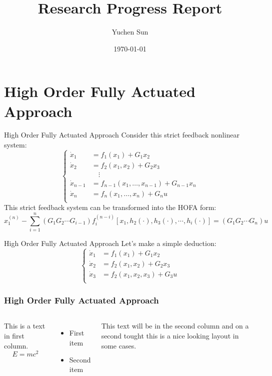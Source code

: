 \documentclass{beamer}
\title{Research Progress Report}
\author{Yuchen Sun}
\institute{Ocean University of China}
\date{\today}
\begin{document}
\maketitle
\footnotesize
\begin{frame}
    \tableofcontents
\end{frame}
\section{High Order Fully Actuated Approach}

\begin{frame}{High Order Fully Actuated Approach}
Consider this strict feedback nonlinear system:
$$
\left\{
\begin{aligned}
\dot{x}_1&=f_1(x_1)+G_1x_2\\
\dot{x}_2&=f_2(x_1,x_2)+G_2x_3\\
&\quad\vdots\\
\dot{x}_{n-1}&=f_{n-1}(x_1,\ldots,x_{n-1})+G_{n-1}x_n\\
\dot{x}_n&=f_n(x_1,\ldots,x_n)+G_nu\\
\end{aligned}
\right.
$$
This strict feedback system can be transformed into the HOFA form:
$$
x_1^{(n)}-\sum_{i=1}^{n}(G_1G_2{\cdots}G_{i-1})f_{i}^{(n-i)}[x_1,h_2(\cdot),h_3(\cdot),\cdots,h_i(\cdot)]=(G_1G_2{\cdots}G_{n})u
$$
\end{frame}

\begin{frame}{High Order Fully Actuated Approach}
Let's make a simple deduction:
$$
\left\{
\begin{aligned}
\dot{x}_1&=f_1(x_1)+G_1x_2\\
\dot{x}_2&=f_2(x_1,x_2)+G_2x_3\\
\dot{x}_3&=f_2(x_1,x_2,x_3)+G_3u\\
\end{aligned}
\right.
$$
\end{frame}


\begin{frame}
\frametitle{High Order Fully Actuated Approach}
\begin{columns}
This is a text in first column.
$$E=mc^2$$
\begin{itemize}
\item First item
\item Second item
\end{itemize}

This text will be in the second column
and on a second tought this is a nice looking
layout in some cases.
\end{columns}
\end{frame}
\end{document}

